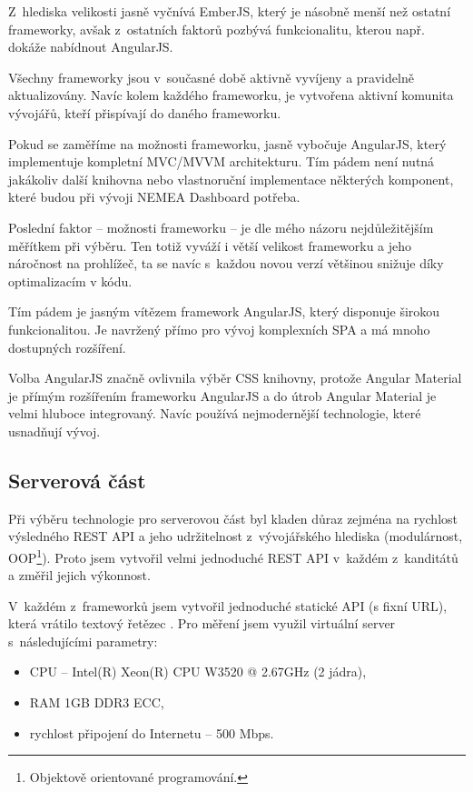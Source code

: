 Z~hlediska velikosti jasně vyčnívá EmberJS, který je násobně menší než ostatní frameworky, avšak z~ostatních faktorů pozbývá funkcionalitu, kterou např. dokáže nabídnout AngularJS.

Všechny frameworky jsou v~současné době aktivně vyvíjeny a pravidelně aktualizovány. Navíc kolem každého frameworku, je vytvořena aktivní komunita vývojářů, kteří přispívají do daného frameworku.

Pokud se zaměříme na možnosti frameworku, jasně vybočuje AngularJS, který implementuje kompletní MVC/MVVM architekturu. Tím pádem není nutná jakákoliv další knihovna nebo vlastnoruční implementace některých komponent, které budou při vývoji NEMEA Dashboard potřeba.

Poslední faktor -- možnosti frameworku -- je dle mého názoru nejdůležitějším měřítkem při výběru. Ten totiž vyváží i větší velikost frameworku a jeho náročnost na prohlížeč, ta se navíc s~každou novou verzí většinou snižuje díky optimalizacím v kódu.

Tím pádem je jasným vítězem framework AngularJS, který disponuje širokou funkcionalitou. Je navržený přímo pro vývoj komplexních SPA a má mnoho dostupných rozšíření.

Volba AngularJS značně ovlivnila výběr CSS knihovny, protože Angular Material je přímým rozšířením frameworku AngularJS a do útrob Angular Material je velmi hluboce integrovaný. Navíc používá nejmodernější technologie, které usnadňují vývoj.

\subsection{Serverová část}
\label{serv:fin}

Při výběru technologie pro serverovou část byl kladen důraz zejména na rychlost výsledného REST API a jeho udržitelnost z~vývojářského hlediska (modulárnost, OOP\footnote{Objektově orientované programování.}). Proto jsem vytvořil velmi jednoduché REST API v~každém z~kanditátů a změřil jejich výkonnost.

V~každém z~frameworků jsem vytvořil jednoduché statické API (s fixní URL), která vrátilo textový řetězec . Pro měření jsem využil virtuální server s~následujícími parametry:

\begin{itemize}
    \item CPU -- Intel(R) Xeon(R) CPU W3520  @ 2.67GHz (2 jádra),
    \item RAM 1GB DDR3 ECC,
    \item rychlost připojení do Internetu -- 500 Mbps.
\end{itemize}

